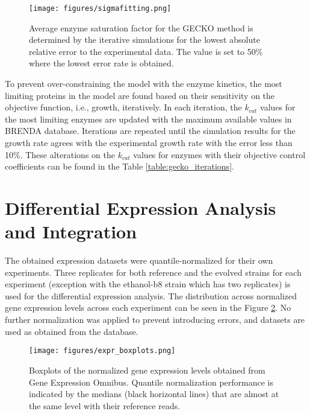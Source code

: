 \begin{figure}[H]
  \begin{center}
    \texttt{[image: figures/sigmafitting.png]}
    \caption[Average enzyme saturation factor for the GECKO method is determined by the iterative simulations for the lowest absolute relative error to the experimental data]{Average enzyme saturation factor for the GECKO method is determined by the iterative simulations for the lowest absolute relative error to the experimental data. The value is set to 50\% where the lowest error rate is obtained.}
    \label{fig:sigma_fitting}
  \end{center}
\end{figure}

To prevent over-constraining the model with the enzyme kinetics, the most limiting proteins in the model are found based on their sensitivity on the objective function, i.e., growth, iteratively. In each iteration, the $k_{cat}$ values for the most limiting enzymes are updated with the maximum available values in BRENDA\cite{jeske2019brenda} database. Iterations are repeated until the simulation results for the growth rate agrees with the experimental growth rate with the error less than 10\%. These alterations on the $k_{cat}$ values for enzymes with their objective control coefficients can be found in the Table \ref{table:gecko_iterations}.



\vspace{-0.5cm}
\section{Differential Expression Analysis and Integration}

The obtained expression datasets were quantile-normalized for their own experiments. Three replicates for both reference and the evolved strains for each experiment (exception with the ethanol-b8 strain which has two replicates) is used for the differential expression analysis. The distribution across normalized gene expression levels across each experiment can be seen in the Figure \ref{fig:expr_boxplot}. No further normalization was applied to prevent introducing errors, and datasets are used as obtained from the database.

\begin{figure}[H]
  \begin{center}
  \texttt{[image: figures/expr\_boxplots.png]}
  \caption[Boxplots of the normalized gene expression levels]{Boxplots of the normalized gene expression levels obtained from Gene Expression Omnibus. Quantile normalization performance is indicated by the medians (black horizontal lines) that are almost at the same level with their reference reads.}
  \label{fig:expr_boxplot}
  \end{center}
\end{figure}


